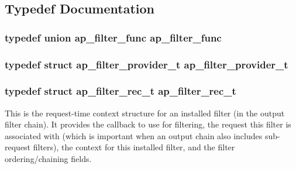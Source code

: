 \subsection{Typedef Documentation}
\subsubsection[{\texorpdfstring{ap\+\_\+filter\+\_\+func}{ap_filter_func}}]{\setlength{\rightskip}{0pt plus 5cm}typedef union {\bf ap\+\_\+filter\+\_\+func}  {\bf ap\+\_\+filter\+\_\+func}}\hypertarget{group__APACHE__CORE__FILTER_gae311727bef0a44e37d84a7c85ff67818}{}\label{group__APACHE__CORE__FILTER_gae311727bef0a44e37d84a7c85ff67818}
\subsubsection[{\texorpdfstring{ap\+\_\+filter\+\_\+provider\+\_\+t}{ap_filter_provider_t}}]{\setlength{\rightskip}{0pt plus 5cm}typedef struct {\bf ap\+\_\+filter\+\_\+provider\+\_\+t} {\bf ap\+\_\+filter\+\_\+provider\+\_\+t}}\hypertarget{group__APACHE__CORE__FILTER_gaa3e9953031f05244ee1ddd40b048de69}{}\label{group__APACHE__CORE__FILTER_gaa3e9953031f05244ee1ddd40b048de69}
\subsubsection[{\texorpdfstring{ap\+\_\+filter\+\_\+rec\+\_\+t}{ap_filter_rec_t}}]{\setlength{\rightskip}{0pt plus 5cm}typedef struct {\bf ap\+\_\+filter\+\_\+rec\+\_\+t} {\bf ap\+\_\+filter\+\_\+rec\+\_\+t}}\hypertarget{group__APACHE__CORE__FILTER_ga3b4690a21db5ddea3704c3aba182eef0}{}\label{group__APACHE__CORE__FILTER_ga3b4690a21db5ddea3704c3aba182eef0}
This is the request-\/time context structure for an installed filter (in the output filter chain). It provides the callback to use for filtering, the request this filter is associated with (which is important when an output chain also includes sub-\/request filters), the context for this installed filter, and the filter ordering/chaining fields.

